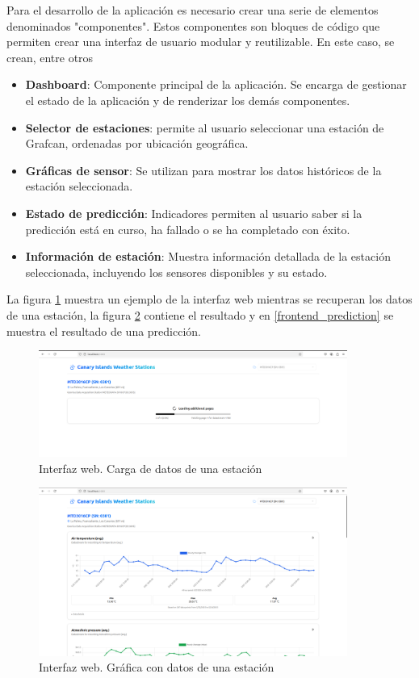 Para el desarrollo de la aplicación es necesario crear una serie de elementos denominados "componentes". Estos componentes son bloques de código que 
permiten crear una interfaz de usuario modular y reutilizable. En este caso, se crean, entre otros
\begin{itemize}
    \item \textbf{Dashboard}: Componente principal de la aplicación. Se encarga de gestionar el estado de la aplicación y de renderizar los demás componentes.
    \item \textbf{Selector de estaciones}: permite al usuario seleccionar una estación de Grafcan, ordenadas por ubicación geográfica.
    \item \textbf{Gráficas de sensor}: Se utilizan para mostrar los datos históricos de la estación seleccionada. 
    \item \textbf{Estado de predicción}: Indicadores permiten al usuario saber si la predicción está en curso, ha fallado o se ha completado con éxito.
    \item \textbf{Información de estación}: Muestra información detallada de la estación seleccionada, incluyendo los sensores disponibles y su estado.
\end{itemize}

La figura \ref{frontend_loading} muestra un ejemplo de la interfaz web mientras se recuperan los datos de una estación, la figura 
\ref{frontend_loaded} contiene el resultado y en \ref{frontend_prediction} se muestra el resultado de una predicción.

\begin{figure}[H]
    \centering
    \includegraphics[width=0.9\textwidth]{images/frontend_loading.png}
    \caption{Interfaz web. Carga de datos de una estación}
    \label{frontend_loading}
\end{figure}

\begin{figure}[H]
    \centering
    \includegraphics[width=0.9\textwidth]{images/frontend_loaded.png}
    \caption{Interfaz web. Gráfica con datos de una estación}
    \label{frontend_loaded}
\end{figure}

